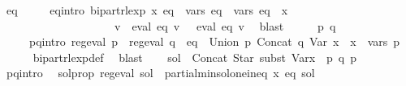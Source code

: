 \begin{isabellebody}
\ eq{\isacharprime}{\kern0pt}\isanewline
\ \ \ \ \ eq{\isacharprime}{\kern0pt}{\isacharunderscore}{\kern0pt}intro{\isacharcolon}{\kern0pt}\ {\isachardoublequoteopen}bipart{\isacharunderscore}{\kern0pt}rlexp\ x\ eq{\isacharprime}{\kern0pt}\ {\isasymand}\ vars\ eq{\isacharprime}{\kern0pt}\ {\isacharequal}{\kern0pt}\ vars\ eq\ {\isasymunion}\ {\isacharbraceleft}{\kern0pt}x{\isacharbraceright}{\kern0pt}\ {\isasymand}\isanewline
\ \ \ \ \ \ \ \ \ \ \ \ \ \ \ \ \ \ \ \ {\isacharparenleft}{\kern0pt}{\isasymforall}v{\isachardot}{\kern0pt}\ {\isasymPsi}\ {\isacharparenleft}{\kern0pt}eval\ eq\ v{\isacharparenright}{\kern0pt}\ {\isacharequal}{\kern0pt}\ {\isasymPsi}\ {\isacharparenleft}{\kern0pt}eval\ eq{\isacharprime}{\kern0pt}\ v{\isacharparenright}{\kern0pt}{\isacharparenright}{\kern0pt}{\isachardoublequoteclose}\ \isamarkupfalse%
\ blast\isanewline
\ \ \isamarkupfalse%
\ \isamarkupfalse%
\ p\ q\isanewline
\ \ \ \ \ p{\isacharunderscore}{\kern0pt}q{\isacharunderscore}{\kern0pt}intro{\isacharcolon}{\kern0pt}\ {\isachardoublequoteopen}reg{\isacharunderscore}{\kern0pt}eval\ p\ {\isasymand}\ reg{\isacharunderscore}{\kern0pt}eval\ q\ {\isasymand}\ eq{\isacharprime}{\kern0pt}\ {\isacharequal}{\kern0pt}\ Union\ p\ {\isacharparenleft}{\kern0pt}Concat\ q\ {\isacharparenleft}{\kern0pt}Var\ x{\isacharparenright}{\kern0pt}{\isacharparenright}{\kern0pt}\ {\isasymand}\ x\ {\isasymnotin}\ vars\ p{\isachardoublequoteclose}\isanewline
\ \ \ \ \isamarkupfalse%
\ bipart{\isacharunderscore}{\kern0pt}rlexp{\isacharunderscore}{\kern0pt}def\ \isamarkupfalse%
\ blast\isanewline
\ \ \isamarkupfalse%
\ {\isacharquery}{\kern0pt}sol\ {\isacharequal}{\kern0pt}\ {\isachardoublequoteopen}Concat\ {\isacharparenleft}{\kern0pt}Star\ {\isacharparenleft}{\kern0pt}subst\ {\isacharparenleft}{\kern0pt}Var{\isacharparenleft}{\kern0pt}x\ {\isacharcolon}{\kern0pt}{\isacharequal}{\kern0pt}\ p{\isacharparenright}{\kern0pt}{\isacharparenright}{\kern0pt}\ q{\isacharparenright}{\kern0pt}{\isacharparenright}{\kern0pt}\ p{\isachardoublequoteclose}\isanewline
\ \ \isamarkupfalse%
\ p{\isacharunderscore}{\kern0pt}q{\isacharunderscore}{\kern0pt}intro\ \isamarkupfalse%
\ sol{\isacharunderscore}{\kern0pt}prop{\isacharcolon}{\kern0pt}\ {\isachardoublequoteopen}reg{\isacharunderscore}{\kern0pt}eval\ {\isacharquery}{\kern0pt}sol\ {\isasymand}\ partial{\isacharunderscore}{\kern0pt}min{\isacharunderscore}{\kern0pt}sol{\isacharunderscore}{\kern0pt}one{\isacharunderscore}{\kern0pt}ineq\ x\ eq{\isacharprime}{\kern0pt}\ {\isacharquery}{\kern0pt}sol{\isachardoublequoteclose}\isanewline

\end{isabellebody}
